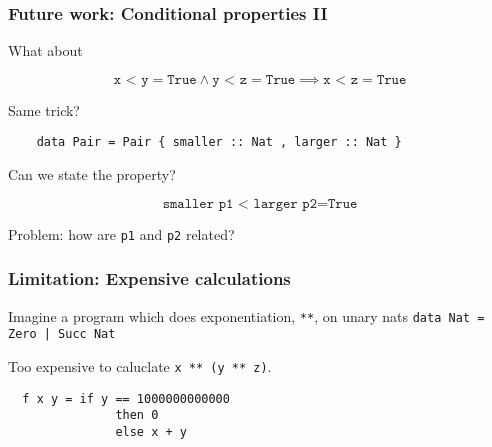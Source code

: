 \documentclass[serif,professionalfont]{beamer}
\newcommand\hs[1]{\texttt{#1}}
\begin{document}
\begin{frame}[fragile]
  \frametitle{Future work: Conditional properties II}

  What about

  \begin{equation*}
    \hs{x < y} = \hs{True} \land
    \hs{y < z} = \hs{True} \implies
    \hs{x < z} = \hs{True}
  \end{equation*}

  \pause
  Same trick?

  \begin{verbatim}
    data Pair = Pair { smaller :: Nat , larger :: Nat }
  \end{verbatim}

  Can we state the property?

  \begin{equation*}
    \hs{smaller p1 < larger p2} = \hs{True}
  \end{equation*}

  \pause
  {\color{red} Problem:} how are \hs{p1} and \hs{p2} related?

\end{frame}

\begin{frame}[fragile]
  \frametitle{Limitation: Expensive calculations}

  Imagine a program which does exponentiation, \hs{**}, on
  unary nats \hs{data Nat = Zero | Succ Nat}

  \vspace{\baselineskip}

  Too expensive to caluclate \hs{x ** (y ** z)}.

  \vspace{\baselineskip}

  \pause

  \begin{verbatim}
  f x y = if y == 1000000000000
               then 0
               else x + y
  \end{verbatim}
\end{frame}
\end{document}
